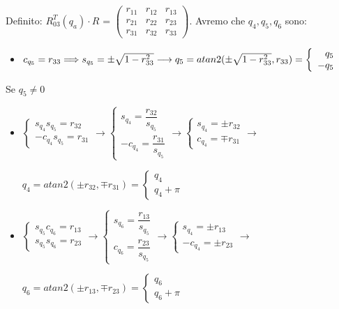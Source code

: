 \documentclass[a4paper,12pt]{article}
\begin{document}
Definito: $R_{03}^T(q_a) \cdot R$ = $\begin{pmatrix}{r_{11}} & {r_{12}} & {r_{13}}\\
{r_{21}} & {r_{22}} & {r_{23}}\\
{r_{31}} & {r_{32}} & {r_{33}}\end{pmatrix}$.
Avremo che $q_4,q_5,q_6$ sono:

\begin{itemize}
\item $c_{q_5} = r_{33} \Longrightarrow s_{q_5} = \pm \sqrt{1-r_{33}^2}
		\hfill \longrightarrow \hfill
		q_5 = atan2 (\pm \sqrt{1-r_{33}^2},r_{33}) = \left \{ \begin{array}{rl}
		q_5\\
		-q_5
		\end{array}
		\right.$
\end{itemize}
Se $q_5 \neq 0$
\begin{itemize}	

\item $\left \{ \begin{array}{rl}
		s_{q_4}s_{q_5}=r_{32} \\
		-c_{q_4}s_{q_5}=r_{31}
		\end{array}
		\right. %
		\longrightarrow
		\left \{ \begin{array}{rl}
		s_{q_4}=\dfrac{r_{32}}{s_{q_5}} \\
		-c_{q_4}=\dfrac{r_{31}}{s_{q_5}}
		\end{array}
		\right.
		\longrightarrow
		\left \{ \begin{array}{rl}
		s_{q_4}=\pm r_{32}\\
		c_{q_4}=\mp r_{31}
		\end{array}
		\right.
		\longrightarrow $
				
		$q_4 = atan2 (\pm r_{32},\mp r_{31}) =
		\left \{ \begin{array}{rl}
		q_4\\
		q_4+\pi
		\end{array}
		\right.$
		
		
\item $\left \{ \begin{array}{rl}
		s_{q_5}c_{q_6}=r_{13} \\
		s_{q_5}s_{q_6}=r_{23}
		\end{array}
		\right. %
		\longrightarrow
		\left \{ \begin{array}{rl}
		s_{q_6}=\dfrac{r_{13}}{s_{q_5}} \\
		c_{q_6}=\dfrac{r_{23}}{s_{q_5}}
		\end{array}
		\right.
		\longrightarrow
		\left \{ \begin{array}{rl}
		s_{q_4}=\pm r_{13}\\
		-c_{q_4}=\pm r_{23}
		\end{array}
		\right.
		\longrightarrow $
				
		$q_6 = atan2 (\pm r_{13},\mp r_{23}) =
		\left \{ \begin{array}{rl}
		q_6\\
		q_6+\pi
		\end{array}
		\right.$		
\end{itemize}
\newpage
\end{document}
